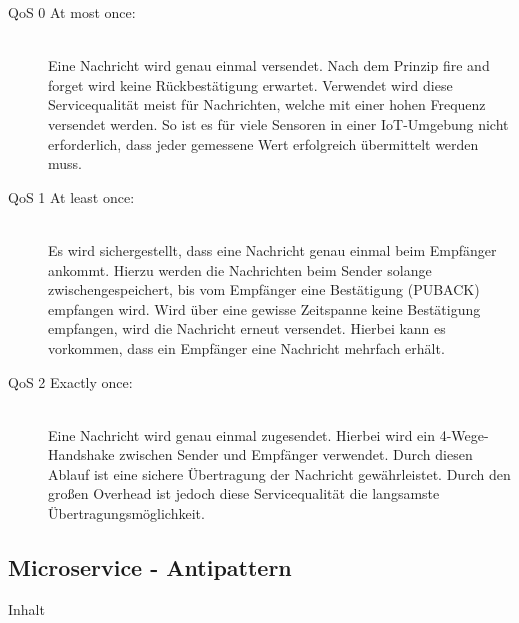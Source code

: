 \begin{description}
    \item[QoS 0 \glqq At most once\grqq{}:]\hfill \\
    Eine Nachricht wird genau einmal versendet. Nach dem Prinzip \glqq fire and forget\grqq{} wird keine Rückbestätigung erwartet. Verwendet wird diese Servicequalität meist für Nachrichten, welche mit einer hohen Frequenz versendet werden. So ist es für viele Sensoren in einer IoT-Umgebung nicht erforderlich, dass jeder gemessene Wert erfolgreich übermittelt werden muss.
    
    \item[QoS 1 \glqq At least once\grqq{}:]\hfill \\
    Es wird sichergestellt, dass eine Nachricht genau einmal beim Empfänger ankommt. Hierzu werden die Nachrichten beim Sender solange zwischengespeichert, bis vom Empfänger eine Bestätigung (PUBACK) empfangen wird. Wird über eine gewisse Zeitspanne keine Bestätigung empfangen, wird die Nachricht erneut versendet. Hierbei kann es vorkommen, dass ein Empfänger eine Nachricht mehrfach erhält. \cite{FlorianRaschbichler.2017}
    
    \item[QoS 2 \glqq Exactly once\grqq{}:]\hfill \\
    Eine Nachricht wird genau einmal zugesendet. Hierbei wird ein 4-Wege-Handshake zwischen Sender und Empfänger verwendet. Durch diesen Ablauf ist eine sichere Übertragung der Nachricht gewährleistet. Durch den großen Overhead ist jedoch diese Servicequalität die langsamste Übertragungsmöglichkeit.

\end{description}

\subsection{Microservice - Antipattern\label{subsec2.2.2:Unterunterpunkt-2}}

Inhalt






